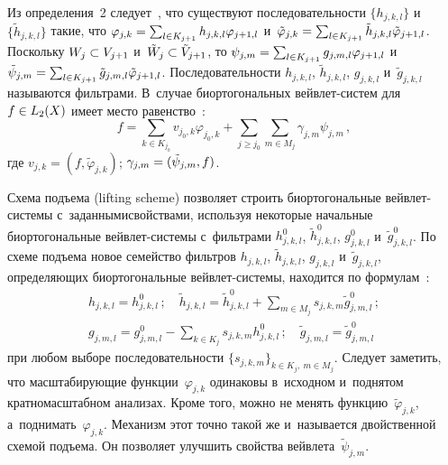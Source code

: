 \begin{multicols}{2}
  Из определения~2 следует~\cite{5-bos}, что существуют последовательности $\{ 
h_{j,k,l}\}$ и~$\{\tilde{h}_{j,k,l}\}$ такие, что $\varphi_{j,k}\hm= \sum\nolimits_{l\in 
K_{j+1}} h_{j,k,l}\varphi_{j+1,l}$ и~$\tilde{\varphi}_{j,k}\hm= \sum\nolimits_{l\in 
K_{j+1}} \tilde{h}_{j,k,l} \tilde{\varphi}_{j+1,l}$. Поскольку $W_j\hm\subset 
V_{j+1}$ и~$\tilde{W}_j\hm\subset \tilde{V}_{j+1}$, то $\psi_{j,m}\hm= 
\sum\nolimits_{l\in K_{j+1}} g_{j,m,l}\varphi_{j+1,l}$ и~$\tilde{\psi}_{j,m}\hm= 
\sum\nolimits_{l\in K_{j+1}} \tilde{g}_{j,m,l} \tilde{\varphi}_{j+1,l}$. 
Последовательности $h_{j,k,l}$, $\tilde{h}_{j,k,l}$, $g_{j,k,l}$ и~$\tilde{g}_{j,k,l}$ 
называются фильтрами. В~случае би\-ор\-то\-го\-наль\-ных  
вейв\-лет-сис\-тем для $f\hm\in L_2(X)$ имеет мес\-то равенство~\cite{5-bos, 8-bos}:
  $$
  f=\sum\limits_{k\in K_{j_0}} v_{j_0,k}\varphi_{j_0,k}+ \sum\limits_{j\geq j_0} 
\sum\limits_{m\in M_j} \gamma_{j,m}\psi_{j,m}\,,
  $$ 
  где $v_{j,k} = (f,\tilde{\varphi}_{j,k})$; $\gamma_{j,m} \hm= 
(\tilde{\psi}_{j,m},f)$. 
  
  Схема подъема (lifting scheme) позволяет строить би\-ор\-то\-го\-наль\-ные  
вейв\-лет-сис\-те\-мы с~заданными\linebreak свойствами, используя некоторые начальные 
би\-ор\-то\-го\-наль\-ные вейв\-лет-сис\-те\-мы с~фильт\-ра\-ми $h^0_{j,k,l}$, 
$\tilde{h}^0_{j,k,l}$, $g^0_{j,k,l}$ и~$\tilde{g}^0_{j,k,l}$. По схеме подъема новое 
семейство фильт\-ров $h_{j,k,l}$, $\tilde{h}_{j,k,l}$, $g_{j,k,l}$ и~$\tilde{g}_{j,k,l}$, 
опре\-де\-ля\-ющих биортогональные вейв\-лет-сис\-те\-мы, находится по 
формулам~\cite{5-bos}:
  \begin{gather*}
  h_{j,k,l} =h^0_{j,k,l}\,;\quad
  \tilde{h}_{j,k,l} =\tilde{h}^0_{j,k,l} 
+\sum\limits_{m\in M_j} s_{j,k,m}\tilde{g}^0_{j,m,l}\,;\\
  g_{j,m,l}= g^0_{j,m,l} -\sum\limits_{k\in K_j} s_{j,k,m} 
h^0_{j,k,l}\,;\quad
  \tilde{g}_{j,m,l}=\tilde{g}^0_{j,m,l} 
  \end{gather*}
при любом выборе последовательности $\{ s_{j,k,m}\}_{k\in K_j, \ m\in M_j}$. 
Следует заметить, что мас\-шта\-би\-ру\-ющие функции~$\varphi_{j,k}$ одинаковы 
в~исходном и~поднятом крат\-но\-мас\-штаб\-ном анализах. Кроме того, можно не 
менять функцию~$\tilde{\varphi}_{j,k}$, а~поднимать~$\varphi_{j,k}$. Механизм 
этот точ\-но такой же и~называется двойственной схемой подъема. Он позволяет 
улучшить свойства вейв\-ле\-та~$\tilde{\psi}_{j,m}$.
  

\end{multicols}
